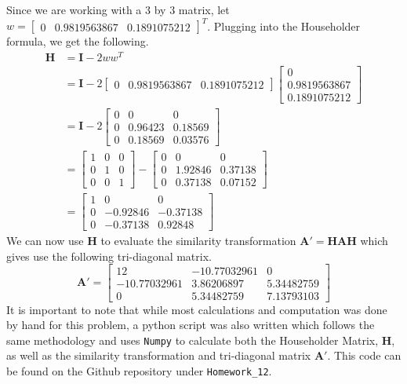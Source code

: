 \documentclass{article}
\begin{document}
Since we are working with a \(3\) by \(3\) matrix, let \(w=\begin{bmatrix}
    0 & 0.9819563867 & 0.1891075212
\end{bmatrix}^T\). Plugging into the Householder formula, we get the following.
\[
\begin{split}
    \mathbf{H} &= \mathbf{I} - 2ww^T \\
    &= \mathbf{I} - 2 \begin{bmatrix}
        0 & 0.9819563867 & 0.1891075212
    \end{bmatrix} \begin{bmatrix}
        0 \\
        0.9819563867 \\
        0.1891075212
    \end{bmatrix} \\
    &= \mathbf{I} - 2 \begin{bmatrix}
        0 & 0 & 0 \\
        0 & 0.96423 & 0.18569 \\
        0 & 0.18569 & 0.03576
    \end{bmatrix} \\
    &= \begin{bmatrix}
        1 & 0 & 0 \\
        0 & 1 & 0 \\
        0 & 0 & 1 
    \end{bmatrix} - \begin{bmatrix}
        0 & 0 & 0 \\
        0 & 1.92846 & 0.37138 \\
        0 & 0.37138 & 0.07152
    \end{bmatrix} \\
    &= \begin{bmatrix}
        1 & 0 & 0 \\
        0 & -0.92846 & -0.37138 \\
        0 & -0.37138 & 0.92848 
    \end{bmatrix}
\end{split}
\]
We can now use \(\mathbf{H}\) to evaluate the similarity transformation \(\mathbf{A}'=\mathbf{HAH}\) which gives use the following tri-diagonal matrix.
\[
\mathbf{A}' = \begin{bmatrix}
    12 & -10.77032961 & 0 \\
    -10.77032961 & 3.86206897 & 5.34482759 \\
    0 & 5.34482759 & 7.13793103
\end{bmatrix}
\]
It is important to note that while most calculations and computation was done by hand for this problem, a python script was also written which follows the same methodology and uses \texttt{Numpy} to calculate both the Householder Matrix, \(\mathbf{H}\), as well as the similarity transformation and tri-diagonal matrix \(\mathbf{A}'\). This code can be found on the Github repository under \texttt{Homework\_12}.
\end{document}
